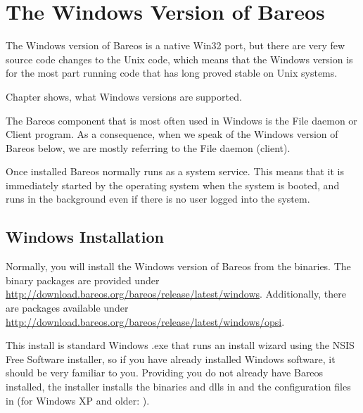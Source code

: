 
\chapter{The Windows Version of Bareos}
\label{Win32Chapter}
\label{sec:windows}

The Windows version of Bareos is a native Win32 port, but there
are very few source code changes to the Unix code, which means that the
Windows version is for the most part running code that has long proved
stable on Unix systems.

Chapter  shows, what Windows versions are supported.

The Bareos component that is most often used in Windows
is the File daemon or Client program.
As a consequence, when we
speak of the Windows version of Bareos below, we are mostly referring to
the File daemon (client).

Once installed Bareos normally runs as a system service. This means that it is
immediately started by the operating system when the system is booted, and
runs in the background even if there is no user logged into the system.

\section{Windows Installation}
\label{Windows:Installation}
\label{Windows:Configuration:Files}

Normally, you will install the Windows version of Bareos from the binaries.
The  binary packages are provided under \url{http://download.bareos.org/bareos/release/latest/windows}.
Additionally, there are  packages available under \url{http://download.bareos.org/bareos/release/latest/windows/opsi}.

This install is standard Windows .exe that runs an install wizard using the
NSIS Free Software installer, so if you have already installed Windows
software, it should be very familiar to you.
Providing you do not already
have Bareos installed, the installer installs the binaries and dlls in
 and the configuration files
in  (for Windows XP and older: ).

